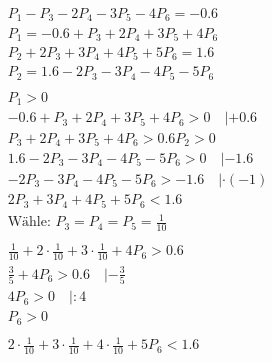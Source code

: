 \begin{align*}
    P_1 - P_3 - 2P_4 - 3P_5 - 4P_6 = -0.6                                                                 \\
    P_1 = -0.6 + P_3 + 2P_4 + 3P_5 + 4P_6                                                                 \\
    P_2 + 2P_3 + 3P_4 + 4P_5 + 5P_6 = 1.6                                                                 \\
    P_2 = 1.6 - 2P_3 - 3P_4 - 4P_5 - 5P_6                                                                 \\\\
    P_1 > 0                                                                                               \\
    -0.6 + P_3 + 2P_4 + 3P_5 + 4P_6 > 0 \quad | + 0.6                                                     \\
    P_3 + 2P_4 + 3P_5 + 4P_6 > 0.6
    P_2 > 0                                                                                               \\
    1.6 - 2P_3 - 3P_4 - 4P_5 - 5P_6 > 0 \quad | -1.6                                                      \\
    - 2P_3 - 3P_4 - 4P_5 - 5P_6 > -1.6 \quad |\cdot (-1)                                                  \\
    2P_3 + 3P_4 + 4P_5 + 5P_6 < 1.6                                                                       \\
    \text{Wähle: } P_3 = P_4 = P_5 = \frac{1}{10}                                                         \\ \\
    \frac{1}{10} + 2 \cdot \frac{1}{10} + 3 \cdot \frac{1}{10} + 4P_6 > 0.6                               \\
    \frac{3}{5} + 4P_6 > 0.6 \quad | - \frac{3}{5}                                                        \\
    4P_6 > 0 \quad | : 4                                                                                  \\
    P_6 > 0                                                                                               \\\\
    2 \cdot \frac{1}{10} + 3 \cdot \frac{1}{10} + 4 \cdot \frac{1}{10} + 5P_6 < 1.6                       \\

\end{align*}

